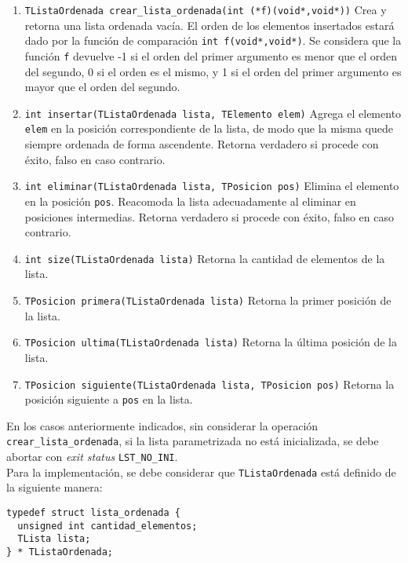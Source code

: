 \documentclass[12pt,a4paper]{article}
\begin{document}
\begin{enumerate}
	
	\item \texttt{TListaOrdenada crear\_lista\_ordenada(int (*f)(void*,void*))} Crea y retorna una lista ordenada vacía. El orden de los elementos insertados estará dado por la función de comparación \texttt{int f(void*,void*)}. Se considera que la función \texttt{f} devuelve -1 si el orden del primer argumento es menor que el orden del segundo, 0 si el orden es el mismo, y 1 si el orden del primer argumento es mayor que el orden del segundo.
	
	\item \texttt{int insertar(TListaOrdenada lista,  TElemento elem)} Agrega el elemento \texttt{elem} en la posición correspondiente de la lista, de modo que la misma quede siempre ordenada de forma ascendente. Retorna verdadero si procede con éxito, falso en caso contrario.
	
	\item \texttt{int eliminar(TListaOrdenada lista, TPosicion pos)} Elimina el elemento en la posición \texttt{pos}. Reacomoda la lista adecuadamente al eliminar en posiciones intermedias. Retorna verdadero si procede con éxito, falso en caso contrario.
	
	\item \texttt{int size(TListaOrdenada lista)} Retorna la cantidad de elementos de la lista.
	
	\item \texttt{TPosicion primera(TListaOrdenada lista)} Retorna la primer posición de la lista.
	
	\item \texttt{TPosicion ultima(TListaOrdenada lista)} Retorna la última posición de la lista.

	\item \texttt{TPosicion siguiente(TListaOrdenada lista, TPosicion pos)} Retorna la posición siguiente a \texttt{pos} en la lista.
	
\end{enumerate}

En los casos anteriormente indicados, sin considerar la operación \texttt{crear\_lista\_ordenada}, si la lista parametrizada no está inicializada, se debe abortar con \emph{exit status} \texttt{LST\_NO\_INI}. \\

Para la implementación, se debe considerar que \texttt{TListaOrdenada} está definido de la siguiente manera:

\begin{verbatim}
typedef struct lista_ordenada {
  unsigned int cantidad_elementos;
  TLista lista;
} * TListaOrdenada;
\end{verbatim}
\end{document}
